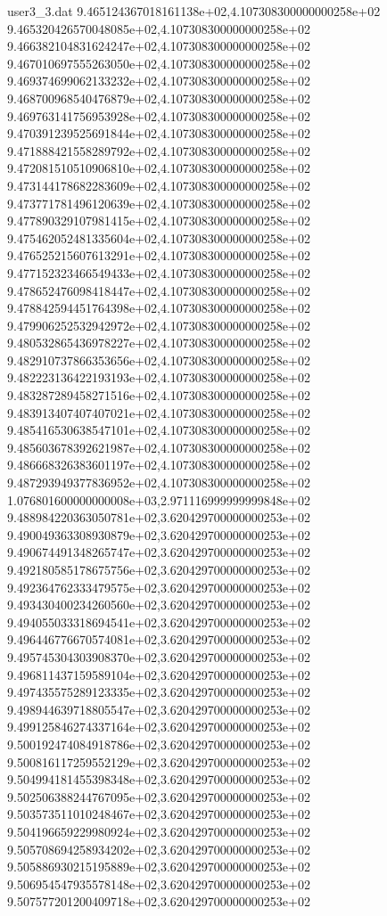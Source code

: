 \begin{filecontents}{user3_3.dat}
9.465124367018161138e+02,4.107308300000000258e+02
9.465320426570048085e+02,4.107308300000000258e+02
9.466382104831624247e+02,4.107308300000000258e+02
9.467010697555263050e+02,4.107308300000000258e+02
9.469374699062133232e+02,4.107308300000000258e+02
9.468700968540476879e+02,4.107308300000000258e+02
9.469763141756953928e+02,4.107308300000000258e+02
9.470391239525691844e+02,4.107308300000000258e+02
9.471888421558289792e+02,4.107308300000000258e+02
9.472081510510906810e+02,4.107308300000000258e+02
9.473144178682283609e+02,4.107308300000000258e+02
9.473771781496120639e+02,4.107308300000000258e+02
9.477890329107981415e+02,4.107308300000000258e+02
9.475462052481335604e+02,4.107308300000000258e+02
9.476525215607613291e+02,4.107308300000000258e+02
9.477152323466549433e+02,4.107308300000000258e+02
9.478652476098418447e+02,4.107308300000000258e+02
9.478842594451764398e+02,4.107308300000000258e+02
9.479906252532942972e+02,4.107308300000000258e+02
9.480532865436978227e+02,4.107308300000000258e+02
9.482910737866353656e+02,4.107308300000000258e+02
9.482223136422193193e+02,4.107308300000000258e+02
9.483287289458271516e+02,4.107308300000000258e+02
9.483913407407407021e+02,4.107308300000000258e+02
9.485416530638547101e+02,4.107308300000000258e+02
9.485603678392621987e+02,4.107308300000000258e+02
9.486668326383601197e+02,4.107308300000000258e+02
9.487293949377836952e+02,4.107308300000000258e+02
1.076801600000000008e+03,2.971116999999999848e+02
9.488984220363050781e+02,3.620429700000000253e+02
9.490049363308930879e+02,3.620429700000000253e+02
9.490674491348265747e+02,3.620429700000000253e+02
9.492180585178675756e+02,3.620429700000000253e+02
9.492364762333479575e+02,3.620429700000000253e+02
9.493430400234260560e+02,3.620429700000000253e+02
9.494055033318694541e+02,3.620429700000000253e+02
9.496446776670574081e+02,3.620429700000000253e+02
9.495745304303908370e+02,3.620429700000000253e+02
9.496811437159589104e+02,3.620429700000000253e+02
9.497435575289123335e+02,3.620429700000000253e+02
9.498944639718805547e+02,3.620429700000000253e+02
9.499125846274337164e+02,3.620429700000000253e+02
9.500192474084918786e+02,3.620429700000000253e+02
9.500816117259552129e+02,3.620429700000000253e+02
9.504994181455398348e+02,3.620429700000000253e+02
9.502506388244767095e+02,3.620429700000000253e+02
9.503573511010248467e+02,3.620429700000000253e+02
9.504196659229980924e+02,3.620429700000000253e+02
9.505708694258934202e+02,3.620429700000000253e+02
9.505886930215195889e+02,3.620429700000000253e+02
9.506954547935578148e+02,3.620429700000000253e+02
9.507577201200409718e+02,3.620429700000000253e+02

\end{filecontents}
